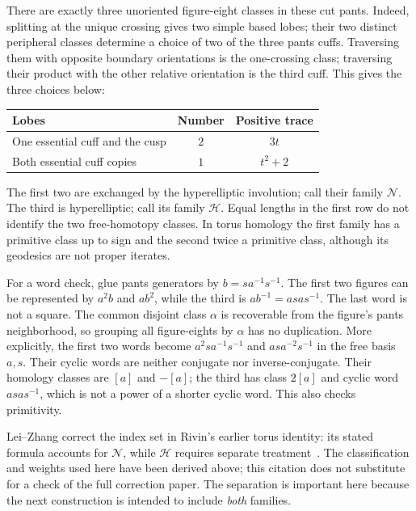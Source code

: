 There are exactly three unoriented figure-eight classes in these cut pants.
Indeed, splitting at the unique crossing gives two simple based lobes;
their two distinct peripheral classes determine a choice of two of the three
pants cuffs. Traversing them with opposite boundary orientations is the
one-crossing class; traversing their product with the other relative
orientation is the third cuff. This gives the three choices below:
\begin{center}
\begin{tabular}{@{}p{}c c@{}}
\toprule
Lobes & Number & Positive trace\\
\midrule
One essential cuff and the cusp & $2$ & $3t$\\
Both essential cuff copies & $1$ & $t^2+2$\\
\bottomrule
\end{tabular}
\end{center}
The first two are exchanged by the hyperelliptic involution; call their
family $\mathcal N$. The third is hyperelliptic; call its family
$\mathcal H$. Equal lengths in the first row do not identify the two
free-homotopy classes. In torus homology the first family has a primitive
class up to sign and the second twice a primitive class, although its
geodesics are not proper iterates.

For a word check, glue pants generators by $b=s a^{-1}s^{-1}$. The first
two figures can be represented by $a^2b$ and $ab^2$, while the third is
$ab^{-1}=asa s^{-1}$. The last word is not a square. The common disjoint
class $\alpha$ is recoverable from the figure's pants neighborhood, so
grouping all figure-eights by $\alpha$ has no duplication.
More explicitly, the first two words become $a^2sa^{-1}s^{-1}$ and
$asa^{-2}s^{-1}$ in the free basis $a,s$. Their cyclic words are neither
conjugate nor inverse-conjugate. Their homology classes are $[a]$ and
$-[a]$; the third has class $2[a]$ and cyclic word $asa s^{-1}$, which
is not a power of a shorter cyclic word. This also checks primitivity.

Lei--Zhang correct the index set in Rivin's earlier torus identity: its
stated formula accounts for $\mathcal N$, while $\mathcal H$ requires
separate treatment~\cite[p.~2350049-1, abstract]{LeiZhang}. The
classification and weights used here have been derived above; this
citation does not substitute for a check of the full correction paper.
The separation is important here
because the next construction is intended to include \emph{both} families.

